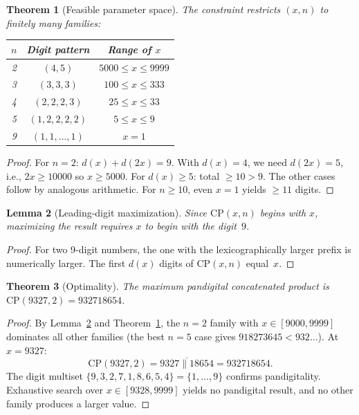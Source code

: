 \documentclass[12pt]{article}
\newtheorem{theorem}{Theorem}
\newtheorem{lemma}[theorem]{Lemma}
\theoremstyle{definition}
\begin{document}
\begin{theorem}[Feasible parameter space]
\label{thm:space}
The constraint restricts $(x,n)$ to finitely many families:
\begin{center}
\begin{tabular}{ccc}
\hline
$n$ & Digit pattern & Range of $x$ \\
\hline
2 & $(4,5)$ & $5000 \le x \le 9999$ \\
3 & $(3,3,3)$ & $100 \le x \le 333$ \\
4 & $(2,2,2,3)$ & $25 \le x \le 33$ \\
5 & $(1,2,2,2,2)$ & $5 \le x \le 9$ \\
9 & $(1,1,\ldots,1)$ & $x = 1$ \\
\hline
\end{tabular}
\end{center}
\end{theorem}
\begin{proof}
For $n=2$: $d(x) + d(2x) = 9$. With $d(x)=4$, we need $d(2x)=5$, i.e., $2x \ge 10000$ so $x \ge 5000$. For $d(x) \ge 5$: total $\ge 10 > 9$. The other cases follow by analogous arithmetic. For $n \ge 10$, even $x=1$ yields $\ge 11$ digits.
\end{proof}

\begin{lemma}[Leading-digit maximization]
\label{lem:leading}
Since $\mathrm{CP}(x,n)$ begins with $x$, maximizing the result requires $x$ to begin with the digit~$9$.
\end{lemma}
\begin{proof}
For two 9-digit numbers, the one with the lexicographically larger prefix is numerically larger. The first $d(x)$ digits of $\mathrm{CP}(x,n)$ equal~$x$.
\end{proof}

\begin{theorem}[Optimality]
\label{thm:optimal}
The maximum pandigital concatenated product is $\mathrm{CP}(9327, 2) = 932718654$.
\end{theorem}
\begin{proof}
By Lemma~\ref{lem:leading} and Theorem~\ref{thm:space}, the $n=2$ family with $x \in [9000, 9999]$ dominates all other families (the best $n=5$ case gives $918273645 < 932\ldots$). At $x=9327$:
\[
    \mathrm{CP}(9327, 2) = \overline{9327 \| 18654} = 932718654.
\]
The digit multiset $\{9,3,2,7,1,8,6,5,4\} = \{1,\ldots,9\}$ confirms pandigitality. Exhaustive search over $x \in [9328, 9999]$ yields no pandigital result, and no other family produces a larger value.
\end{proof}
\end{document}
